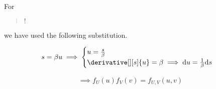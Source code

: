 \begin{solution}
\begin{enumerate}[label = (\alph*)]
    For \blockquote{$!$} we have used the following substitution.

    \begin{align*}
        s = \beta u
        \implies
        \begin{cases}
            u = \frac{s}{\beta} \\
            \derivative[][s]{u} = \beta \implies \mathrm d u = \frac{1}{\beta} \mathrm d s
        \end{cases}
    \end{align*}

    \begin{align*}
        \implies
        f_U(u) f_V(v) = f_{U, V}(u, v)        
    \end{align*}

\end{enumerate}

\end{solution}

